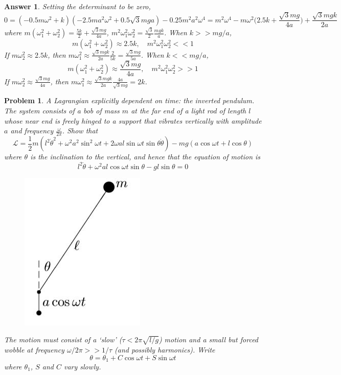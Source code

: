 \documentclass[a4paper]{article}
\newtheorem{ans}{Answer}[subsection]
\theoremstyle{new}
\newtheorem{qns}{Problem}[section]
\begin{document}
\begin{ans}
Setting the determinant to be zero, 
$$0=(-0.5m\omega^2+k)(-2.5ma^2\omega^2+0.5\sqrt{3}mga)-0.25m^2a^2\omega^4=m^2\omega^4-m\omega^2\bigg(2.5k+\frac{\sqrt{3}mg}{4a}\bigg)+\frac{\sqrt{3}mgk}{2a}$$
where $m(\omega_1^2+\omega_2^2)=\frac{5k}{2}+\frac{\sqrt{3}mg}{4a}$, $m^2\omega_1^2\omega_2^2=\frac{\sqrt{3}}{2}\frac{mgk}{a}$. When $k>>mg/a$,
$$m(\omega_1^2+\omega_2^2)\approx2.5k,\quad m^2\omega_1^2\omega_2^2<<1$$
If $m\omega_2^2\approx2.5k$, then $m\omega_1^2\approx\frac{\sqrt{3}mgk}{2a}\frac{2}{5k}=\frac{\sqrt{3}mg}{5a}$. When $k<<mg/a$,
$$m(\omega_1^2+\omega_2^2)\approx\frac{\sqrt{3}mg}{4a},\quad m^2\omega_1^2\omega_2^2>>1$$
If $m\omega_2^2\approx\frac{\sqrt{3}mg}{4a}$, then $m\omega_1^2\approx\frac{\sqrt{3}mgk}{2a}\frac{4a}{\sqrt{3}mg}=2k$. 
\end{ans}
\begin{qns}
A Lagrangian explicitly dependent on time: the inverted pendulum. The system consists of a bob of mass $m$ at the far end of a light rod of length $l$ whose near end is freely hinged to a support that vibrates vertically with amplitude $a$ and frequency $\frac{\omega}{2\pi}$. Show that
$$\mathcal{L}=\frac{1}{2}m(l^2\dot{\theta}^2+\omega^2a^2\sin^2\omega t+2\omega al\sin\omega t\sin\theta\dot{\theta})-mg(a\cos\omega t+l\cos\theta)$$
where $\theta$ is the inclination to the vertical, and hence that the equation of motion is
$$l^2\ddot{\theta}+\omega^2al\cos\omega t\sin\theta-gl\sin\theta=0$$
\begin{figure}[H]
    \centering
    \includegraphics[scale=0.5]{Q2.JPG}
\end{figure}
The motion must consist of a `slow' ($\tau<2\pi\sqrt{l/g}$) motion and a small but forced wobble at frequency $\omega/2\pi>>1/\tau$ (and possibly harmonics). Write
$$\theta=\theta_1+C\cos\omega t+S\sin\omega t$$
where $\theta_1$, $S$ and $C$ vary slowly.\\[5pt]

\end{qns}
\end{document}
